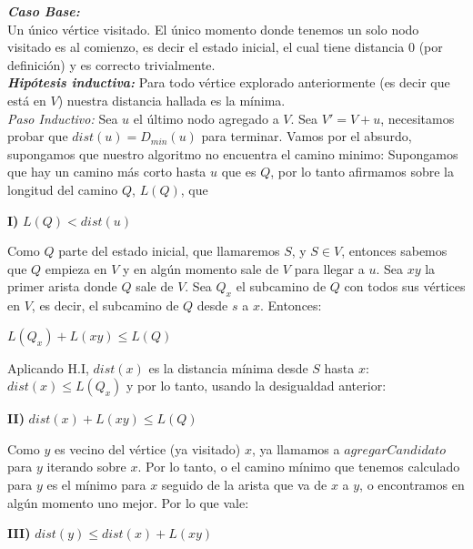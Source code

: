 \emph{\textbf{Caso Base:}}
\\

Un único vértice visitado. El único momento donde tenemos un solo nodo visitado es al comienzo, es decir
el estado inicial, el cual tiene distancia 0 (por definición) y es correcto trivialmente.
\\

\emph{\textbf{Hipótesis inductiva: }} Para todo vértice explorado anteriormente (es decir que está en $V$) nuestra distancia hallada es la mínima.
\\

\emph{Paso Inductivo:} Sea $u$ el último nodo agregado a $V$. Sea $V'= V + u$, necesitamos probar que $dist(u) = D_{min}(u)$ para terminar. Vamos por el absurdo, supongamos que nuestro algoritmo no encuentra el camino minimo: Supongamos que hay un camino más corto hasta $u$ que es $Q$, por lo tanto afirmamos sobre la longitud del camino $Q$, $L(Q)$, que
\\
\begin{center}
\textbf{I)} $L(Q) < dist(u)$
\\
\end{center}
Como $Q$ parte del estado inicial, que llamaremos $S$, y $S \in V$, entonces sabemos que $Q$ empieza en $V$ y en algún momento sale de $V$ para llegar a $u$. Sea $xy$ la primer arista donde $Q$ sale de $V$. Sea $Q_x$ el subcamino de $Q$ con todos sus vértices en $V$, es decir, el subcamino de $Q$ desde $s$ a $x$. Entonces:
\\
\begin{center}
$L(Q_x)+L(xy) \leq L(Q)$
\\
\end{center}
Aplicando H.I, $dist(x)$ es la distancia mínima desde $S$ hasta $x$: $dist(x) \leq L(Q_x)$ y por lo tanto, usando la desigualdad anterior:
\\
\begin{center}
\textbf{II)} $dist(x)+L(xy) \leq L(Q) $
\\
\end{center}
Como $y$ es vecino del vértice (ya visitado) $x$, ya llamamos a $agregarCandidato$ para $y$ iterando sobre $x$. Por lo tanto, o el camino mínimo que tenemos calculado para $y$ es el mínimo para $x$ seguido de la arista que va de $x$ a $y$, o encontramos en algún momento uno mejor. Por lo que vale:
\\
\begin{center}
\textbf{III)} $dist(y) \leq dist(x) + L(xy)$
\\
\end{center}
